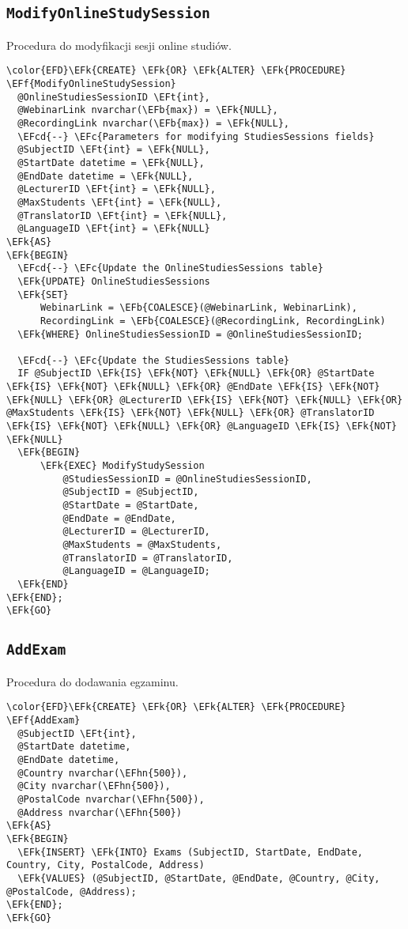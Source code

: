 \documentclass[11pt]{article}
\newcommand{\EFc}[1]{\textcolor{EFc}{\textit{#1}}} %
\newcommand{\EFcd}[1]{\textcolor{EFcd}{\textit{#1}}} %
\newcommand{\EFk}[1]{\textcolor{EFk}{\textbf{#1}}} %
\newcommand{\EFb}[1]{\textcolor{EFb}{\textbf{#1}}} %
\newcommand{\EFf}[1]{\textcolor{EFf}{#1}} %
\newcommand{\EFt}[1]{\textcolor{EFt}{\textbf{#1}}} %
\newcommand{\EFhn}[1]{\textcolor{EFhn}{#1}} %
\begin{document}
\subsection{\texttt{ModifyOnlineStudySession}}
\label{sec:orgb7eafbd}
Procedura do modyfikacji sesji online studiów.
\begin{Code}
\begin{Verbatim}
\color{EFD}\EFk{CREATE} \EFk{OR} \EFk{ALTER} \EFk{PROCEDURE} \EFf{ModifyOnlineStudySession}
  @OnlineStudiesSessionID \EFt{int},
  @WebinarLink nvarchar(\EFb{max}) = \EFk{NULL},
  @RecordingLink nvarchar(\EFb{max}) = \EFk{NULL},
  \EFcd{--} \EFc{Parameters for modifying StudiesSessions fields}
  @SubjectID \EFt{int} = \EFk{NULL},
  @StartDate datetime = \EFk{NULL},
  @EndDate datetime = \EFk{NULL},
  @LecturerID \EFt{int} = \EFk{NULL},
  @MaxStudents \EFt{int} = \EFk{NULL},
  @TranslatorID \EFt{int} = \EFk{NULL},
  @LanguageID \EFt{int} = \EFk{NULL}
\EFk{AS}
\EFk{BEGIN}
  \EFcd{--} \EFc{Update the OnlineStudiesSessions table}
  \EFk{UPDATE} OnlineStudiesSessions
  \EFk{SET} 
      WebinarLink = \EFb{COALESCE}(@WebinarLink, WebinarLink),
      RecordingLink = \EFb{COALESCE}(@RecordingLink, RecordingLink)
  \EFk{WHERE} OnlineStudiesSessionID = @OnlineStudiesSessionID;

  \EFcd{--} \EFc{Update the StudiesSessions table}
  IF @SubjectID \EFk{IS} \EFk{NOT} \EFk{NULL} \EFk{OR} @StartDate \EFk{IS} \EFk{NOT} \EFk{NULL} \EFk{OR} @EndDate \EFk{IS} \EFk{NOT} \EFk{NULL} \EFk{OR} @LecturerID \EFk{IS} \EFk{NOT} \EFk{NULL} \EFk{OR} @MaxStudents \EFk{IS} \EFk{NOT} \EFk{NULL} \EFk{OR} @TranslatorID \EFk{IS} \EFk{NOT} \EFk{NULL} \EFk{OR} @LanguageID \EFk{IS} \EFk{NOT} \EFk{NULL}
  \EFk{BEGIN}
      \EFk{EXEC} ModifyStudySession 
          @StudiesSessionID = @OnlineStudiesSessionID,
          @SubjectID = @SubjectID, 
          @StartDate = @StartDate, 
          @EndDate = @EndDate, 
          @LecturerID = @LecturerID, 
          @MaxStudents = @MaxStudents, 
          @TranslatorID = @TranslatorID, 
          @LanguageID = @LanguageID;
  \EFk{END}
\EFk{END};
\EFk{GO}
\end{Verbatim}
\end{Code}
\subsection{\texttt{AddExam}}
\label{sec:orgd8c8524}
Procedura do dodawania egzaminu.
\begin{Code}
\begin{Verbatim}
\color{EFD}\EFk{CREATE} \EFk{OR} \EFk{ALTER} \EFk{PROCEDURE} \EFf{AddExam}
  @SubjectID \EFt{int},
  @StartDate datetime,
  @EndDate datetime,
  @Country nvarchar(\EFhn{500}),
  @City nvarchar(\EFhn{500}),
  @PostalCode nvarchar(\EFhn{500}),
  @Address nvarchar(\EFhn{500})
\EFk{AS}
\EFk{BEGIN}
  \EFk{INSERT} \EFk{INTO} Exams (SubjectID, StartDate, EndDate, Country, City, PostalCode, Address)
  \EFk{VALUES} (@SubjectID, @StartDate, @EndDate, @Country, @City, @PostalCode, @Address);
\EFk{END};
\EFk{GO}
\end{Verbatim}
\end{Code}
\end{document}
